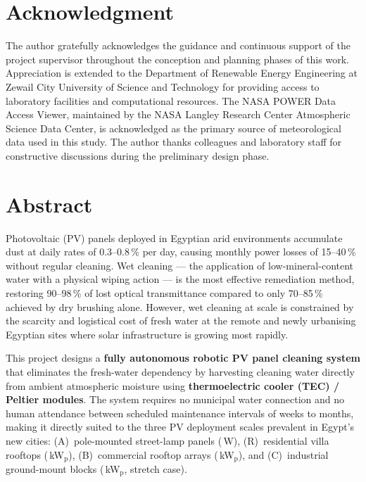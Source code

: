 \documentclass[12pt,a4paper]{report}
\numberwithin{equation}{chapter}
\numberwithin{figure}{chapter}
\numberwithin{table}{chapter}
\newcommand{\Watt}{\,W}
\newcommand{\kWp}{\,kW$_\mathrm{p}$}
\begin{document}
\chapter*{Acknowledgment}
\thispagestyle{plain}

The author gratefully acknowledges the guidance and continuous support of the project
supervisor throughout the conception and planning phases of this work. Appreciation is
extended to the Department of Renewable Energy Engineering at Zewail City University
of Science and Technology for providing access to laboratory facilities and computational
resources. The NASA POWER Data Access Viewer, maintained by the NASA Langley Research
Center Atmospheric Science Data Center, is acknowledged as the primary source of
meteorological data used in this study. The author thanks colleagues and laboratory
staff for constructive discussions during the preliminary design phase.

\newpage

\chapter*{Abstract}
\thispagestyle{plain}

Photovoltaic (PV) panels deployed in Egyptian arid environments accumulate dust at daily
rates of 0.3--0.8\,\% per day, causing monthly power losses of 15--40\,\% without
regular cleaning. Wet cleaning --- the application of low-mineral-content water with a
physical wiping action --- is the most effective remediation method, restoring 90--98\,\%
of lost optical transmittance compared to only 70--85\,\% achieved by dry brushing alone.
However, wet cleaning at scale is constrained by the scarcity and logistical cost of
fresh water at the remote and newly urbanising Egyptian sites where solar infrastructure
is growing most rapidly.

This project designs a \textbf{fully autonomous robotic PV panel cleaning system} that
eliminates the fresh-water dependency by harvesting cleaning water directly from ambient
atmospheric moisture using \textbf{thermoelectric cooler (TEC) / Peltier modules}. The
system requires no municipal water connection and no human attendance between scheduled
maintenance intervals of weeks to months, making it directly suited to the three PV
deployment scales prevalent in Egypt's new cities: (A)~pole-mounted street-lamp panels
(\ScaleAPV\Watt), (R)~residential villa rooftops (\ScaleRPV\kWp), (B)~commercial
rooftop arrays (\ScaleBPV\kWp), and (C)~industrial ground-mount blocks
(\ScaleCPV\kWp, stretch case).
\end{document}

